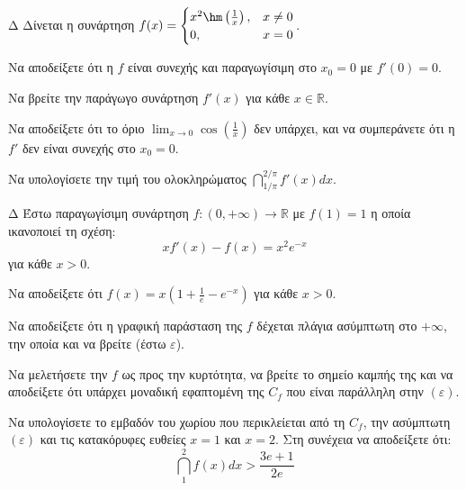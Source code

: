 \begin{thema}{Δ}
Δίνεται η συνάρτηση $\displaystyle f(x) = \begin{cases} x^2 \hm\left(\frac{1}{x}\right), & x \ne 0 \\ 0, & x = 0 \end{cases}$.
\begin{erwthma}
    \item Να αποδείξετε ότι η $f$ είναι συνεχής και παραγωγίσιμη στο $x_0 = 0$ με $f'(0) = 0$.
    \item Να βρείτε την παράγωγο συνάρτηση $f'(x)$ για κάθε $x \in \mathbb{R}$.
    \item Να αποδείξετε ότι το όριο $\displaystyle \lim_{x\to 0} \cos\left(\frac{1}{x}\right)$ δεν υπάρχει, και να συμπεράνετε ότι η $f'$ δεν είναι συνεχής στο $x_0 = 0$.
    \item Να υπολογίσετε την τιμή του ολοκληρώματος $\displaystyle \dint_{1/\pi}^{2/\pi} f'(x) dx$.
\end{erwthma}
\end{thema}

\begin{thema}{Δ}
Έστω παραγωγίσιμη συνάρτηση $f: (0,+\infty) \to \mathbb{R}$ με $f(1)=1$ η οποία ικανοποιεί τη σχέση:
\[ x f'(x) - f(x) = x^2 e^{-x} \]
για κάθε $x>0$.
\begin{erwthma}
    \item Να αποδείξετε ότι $\displaystyle f(x) = x \left(1 + \frac{1}{e} - e^{-x}\right)$ για κάθε $x>0$.
    \item Να αποδείξετε ότι η γραφική παράσταση της $f$ δέχεται πλάγια ασύμπτωτη στο $+\infty$, την οποία και να βρείτε (έστω $\varepsilon$).
    \item Να μελετήσετε την $f$ ως προς την κυρτότητα, να βρείτε το σημείο καμπής της και να αποδείξετε ότι υπάρχει μοναδική εφαπτομένη της $C_f$ που είναι παράλληλη στην $(\varepsilon)$.
    \item Να υπολογίσετε το εμβαδόν του χωρίου που περικλείεται από τη $C_f$, την ασύμπτωτη $(\varepsilon)$ και τις κατακόρυφες ευθείες $x=1$ και $x=2$. Στη συνέχεια να αποδείξετε ότι:
    \[ \dint_1^2 f(x) dx > \frac{3e+1}{2e} \]
\end{erwthma}
\end{thema}


